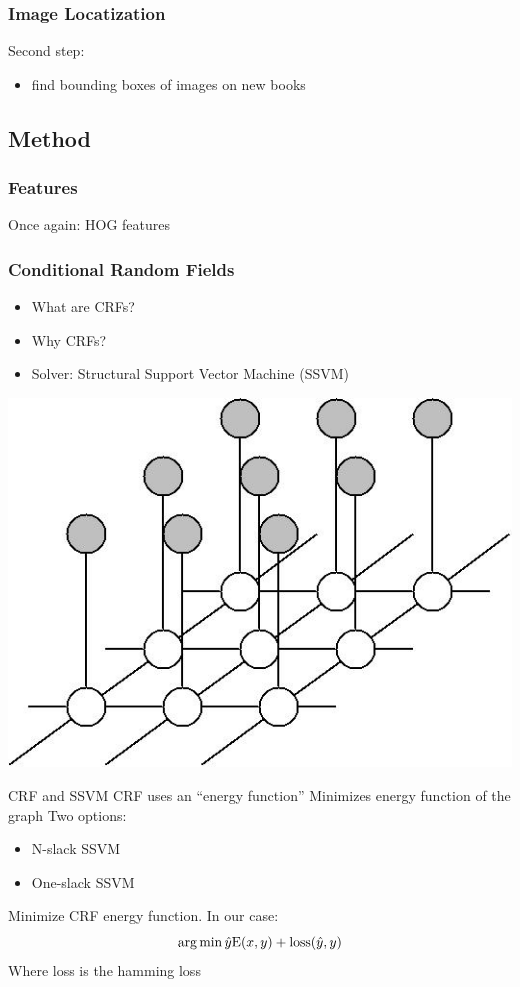 
\begin{frame}
\frametitle{Image Locatization}
Second step:
\begin{itemize}
\item find bounding boxes of images on new books
\end{itemize}
\end{frame}

\subsection{Method}
\begin{frame}
\frametitle{Features}
Once again: HOG features
\end{frame}

\begin{frame}
\frametitle{Conditional Random Fields}
\begin{itemize}
\item What are CRFs?
\item Why CRFs?
\item Solver: Structural Support Vector Machine (SSVM)
\end{itemize}
\includegraphics[width=.5\paperwidth]{resources/crf}
\end{frame}

\begin{frame}{CRF and SSVM}
	CRF uses an ``energy function''
Minimizes energy function of the graph
Two options:
\begin{itemize}
	\item N-slack SSVM
	\item One-slack SSVM
\end{itemize}
Minimize CRF energy function. In our case:
$$\operatorname*{arg\,min} \hat{y} \text{E}(x, y) + \text{loss}(\hat{y}, y) $$
Where loss is the hamming loss


\end{frame}

